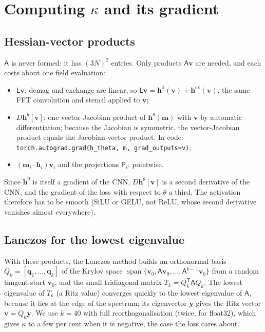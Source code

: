 \documentclass[11pt,a4paper]{article}
\newcommand{\m}{\bm{m}}
\newcommand{\h}{\bm{h}}
\newcommand{\vv}{\bm{v}}
\newcommand{\T}{\mathsf{T}}
\newcommand{\proj}{\mathsf{P}}
\begin{document}
\section{\texorpdfstring{Computing $\kappa$ and its gradient}{Computing kappa and its gradient}}

\subsection{Hessian-vector products}

$\mathsf{A}$ is never formed: it has $(3N)^2$ entries. Only products $\mathsf{A}\vv$ are needed, and
each costs about one field evaluation:
\begin{itemize}
  \item $\mathsf{L}\vv$: demag and exchange are linear, so $\mathsf{L}\vv = \h^\mathrm{d}(\vv)+\h^\mathrm{ex}(\vv)$,
        the same FFT convolution and stencil applied to $\vv$;
  \item $D\h^\theta[\vv]$: one vector-Jacobian product of $\h^\theta(\m)$ with $\vv$ by automatic
        differentiation; because the Jacobian is symmetric, the vector-Jacobian product equals the
        Jacobian-vector product. In code:
        \texttt{torch.autograd.grad(h\_theta, m, grad\_outputs=v)};
  \item $(\m_i\cdot\h_i)\vv_i$ and the projections $\proj_i$: pointwise.
\end{itemize}
Since $\h^\theta$ is itself a gradient of the CNN, $D\h^\theta[\vv]$ is a second derivative of the CNN,
and the gradient of the loss with respect to $\theta$ a third. The activation therefore has to be smooth
(SiLU or GELU, not ReLU, whose second derivative vanishes almost everywhere).

\subsection{Lanczos for the lowest eigenvalue}

With these products, the Lanczos method builds an orthonormal basis $Q_k=[\bm q_1,\dots,\bm q_k]$ of the
Krylov space $\operatorname{span}\{\vv_0,\mathsf{A}\vv_0,\dots,\mathsf{A}^{k-1}\vv_0\}$ from a random
tangent start $\vv_0$, and the small tridiagonal matrix $T_k = Q_k^\T\mathsf{A}Q_k$. The lowest
eigenvalue of $T_k$ (a Ritz value) converges quickly to the lowest eigenvalue of $\mathsf{A}$, because
it lies at the edge of the spectrum; its eigenvector $\bm y$ gives the Ritz vector $\vv = Q_k\bm y$. We use
$k=40$ with full reorthogonalisation (twice, for float32), which gives $\kappa$ to a few per cent when it
is negative, the case the loss cares about.
\end{document}
